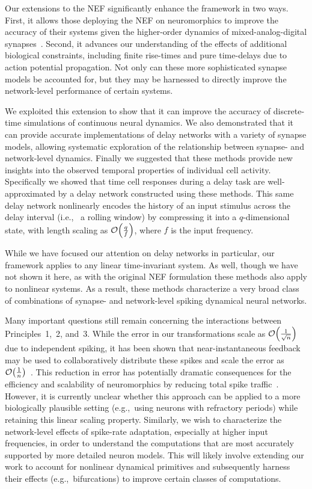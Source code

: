 \documentclass[12pt]{article}
\theoremstyle{definition}
\let\originalleft\left
\let\originalright\right
\renewcommand{\left}{\mathopen{}\mathclose\bgroup\originalleft}
\renewcommand{\right}{\aftergroup\egroup\originalright}
\begin{document}
Our extensions to the NEF significantly enhance the framework in two ways.
First, it allows those deploying the NEF on neuromorphics to improve the accuracy of their systems given the higher-order dynamics of mixed-analog-digital synapses~\citep{voelker2017iscas, voelker2017neuromorphic}.
Second, it advances our understanding of the effects of additional biological constraints, including finite rise-times and pure time-delays due to action potential propagation.
Not only can these more sophisticated synapse models be accounted for, but they may be harnessed to directly improve the network-level performance of certain systems.

We exploited this extension to show that it can improve the accuracy of discrete-time simulations of continuous neural dynamics.
We also demonstrated that it can provide accurate implementations of delay networks with a variety of synapse models, allowing systematic exploration of the relationship between synapse- and network-level dynamics.
Finally we suggested that these methods provide new insights into the observed temporal properties of individual cell activity.
Specifically we showed that time cell responses during a delay task are well-approximated by a delay network constructed using these methods.
This same delay network nonlinearly encodes the history of an input stimulus across the delay interval (i.e.,~ a rolling window) by compressing it into a $q$-dimensional state, with length scaling as $\mathcal{O}\left( \frac{q}{f} \right)$, where $f$ is the input frequency.

While we have focused our attention on delay networks in particular, our framework applies to any linear time-invariant system.
As well, though we have not shown it here, as with the original NEF formulation these methods also apply to nonlinear systems.
As a result, these methods characterize a very broad class of combinations of synapse- and network-level spiking dynamical neural networks.

Many important questions still remain concerning the interactions between Principles~1,~2, and~3.
While the error in our transformations scale as $\mathcal{O} \left( \frac{1}{\sqrt{n}} \right)$ due to independent spiking, it has been shown that near-instantaneous feedback may be used to collaboratively distribute these spikes and scale the error as $\mathcal{O} \left( \frac{1}{n} \right)$~\citep{boerlin2013predictive, thalmeier2016learning}.
This reduction in error has potentially dramatic consequences for the efficiency and scalability of neuromorphics by reducing total spike traffic~\citep{boahen2017neuromorph}.
However, it is currently unclear whether this approach can be applied to a more biologically plausible setting (e.g.,~using neurons with refractory periods) while retaining this linear scaling property.
Similarly, we wish to characterize the network-level effects of spike-rate adaptation, especially at higher input frequencies, in order to understand the computations that are most accurately supported by more detailed neuron models.
This will likely involve extending our work to account for nonlinear dynamical primitives and subsequently harness their effects (e.g.,~bifurcations) to improve certain classes of computations.
\end{document}
